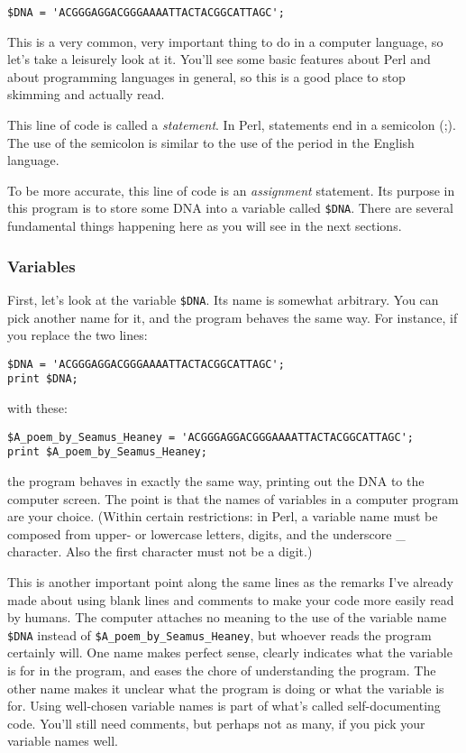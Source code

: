 \begin{lstlisting}
$DNA = 'ACGGGAGGACGGGAAAATTACTACGGCATTAGC';
\end{lstlisting}

This is a very common, very important thing to do in a computer language, so let's take a leisurely look at it. You'll see some basic features about Perl and about programming languages in general, so this is a good place to stop skimming and actually read.

This line of code is called a \textit{statement}. In Perl, statements end in a semicolon (;). The use of the semicolon is similar to the use of the period in the English language.

To be more accurate, this line of code is an \textit{assignment} statement. Its purpose in this program is to store some DNA into a variable called \verb|$DNA|. There are several fundamental things happening here as you will see in the next sections. 

\subsubsection{Variables}
First, let's look at the variable \verb|$DNA|. Its name is somewhat arbitrary.  You can pick another name for it, and the program behaves the same way.  For instance, if you replace the two lines:

\begin{lstlisting}
$DNA = 'ACGGGAGGACGGGAAAATTACTACGGCATTAGC';
print $DNA;
\end{lstlisting}

with these:

\begin{lstlisting}
$A_poem_by_Seamus_Heaney = 'ACGGGAGGACGGGAAAATTACTACGGCATTAGC';
print $A_poem_by_Seamus_Heaney;
\end{lstlisting}

the program behaves in exactly the same way, printing out the DNA to the computer screen. The point is that the names of variables in a computer program are your choice. (Within certain restrictions: in Perl, a variable name must be composed from upper- or lowercase letters, digits, and the underscore \_ character. Also the first character must not be a digit.)

This is another important point along the same lines as the remarks I've already made about using blank lines and comments to make your code more easily read by humans. The computer attaches no meaning to the use of the variable name \verb|$DNA| instead of \verb|$A_poem_by_Seamus_Heaney|, but whoever reads the program certainly will. One name makes perfect sense, clearly indicates what the variable is for in the program, and eases the chore of understanding the program. The other name makes it unclear what the program is doing or what the variable is for. Using well-chosen variable names is part of what's called self-documenting code. You'll still need comments, but perhaps not as many, if you pick your variable names well.

